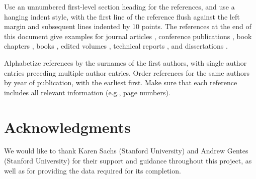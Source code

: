 \documentclass{article}
\begin{document}
Use an unnumbered first-level section heading for the references, and 
use a hanging indent style, with the first line of the reference flush
against the left margin and subsequent lines indented by 10 points. 
The references at the end of this document give examples for journal
articles \cite{Bendall:2011bm}, conference publications \cite{Bendall:2011bm}, book chapters \cite{Bendall:2011bm}, books \cite{Bendall:2011bm}, edited volumes \cite{Bendall:2011bm}, 
technical reports \cite{Crammer:2002uy}, and dissertations \cite{Bendall:2011bm}. 

Alphabetize references by the surnames of the first authors, with
single author entries preceding multiple author entries. Order
references for the same authors by year of publication, with the
earliest first. Make sure that each reference includes all relevant
information (e.g., page numbers).


\section{Acknowledgments} 

We would like to thank Karen Sachs (Stanford University) and Andrew Gentes (Stanford University) for their support and guidance throughout this project, as well as for providing the data required for its completion. 


\nocite{Bendall:2011bm}



%

\end{document}
